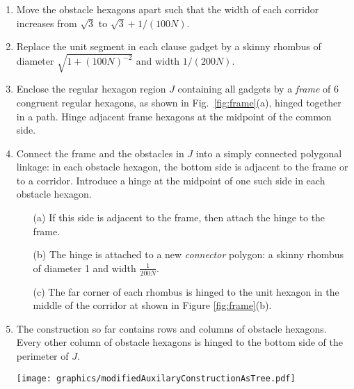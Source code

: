 \documentclass[10pt]{CSUNthesis}
\theoremstyle{plain}%
\theoremstyle{definition}
\theoremstyle{remark}
\newcommand{\lr}[1]{\left( #1 \right)}
\begin{document}
\begin{enumerate}
\item Move the obstacle hexagons apart such that the width of each corridor increases from $\sqrt{3}$ to $\sqrt{3}+1/(100N)$.
\item Replace the unit segment in each clause gadget by a skinny rhombus of diameter $\sqrt{1 + \lr{100N}^{-2}}$ and width $1/(200N)$.
\item Enclose the regular hexagon region $J$ containing all gadgets by a \emph{frame} of 6 congruent regular hexagons, as shown in Fig.~\ref{fig:frame}(a), hinged together in a path. Hinge adjacent frame hexagons at the midpoint of the common side.
\item Connect the frame and the obstacles in $J$ into a simply connected polygonal linkage: in each obstacle
hexagon, the bottom side is adjacent to the frame or to a corridor.
Introduce a hinge at the midpoint of one such side in each obstacle hexagon.
\begin{itemize}
	\item[(a)] If this side is adjacent to the frame, then attach the hinge to the frame. 
	\item[(b)] The hinge is attached to a new \emph{connector} polygon: a skinny rhombus of diameter 1 and width $\frac{1}{200N}$.
	\item[(c)] The far corner of each rhombus is hinged to the unit hexagon in the middle of the corridor at shown in Figure \ref{fig:frame}(b).
\end{itemize} 
\item The construction so far contains rows and columns of obstacle hexagons.
Every other column of obstacle hexagons is hinged to the bottom side of the perimeter of $J$.

\begin{minipage}{\linewidth}
\begin{center}
\texttt{[image: graphics/modifiedAuxilaryConstructionAsTree.pdf]}
\label{fig:modifiedAuxilaryConstructionAsTree.pdf}
\end{center}
\end{minipage}


\end{enumerate}
\end{document}
